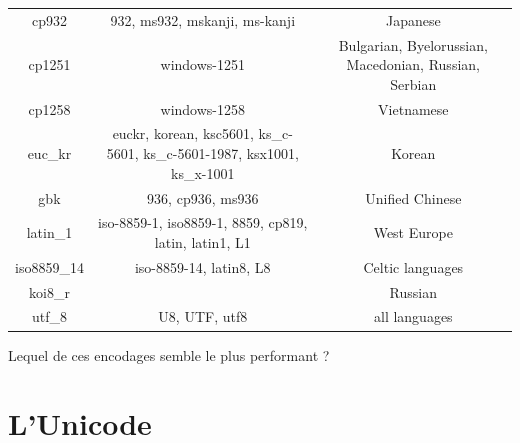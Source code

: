 \begin{center}
{\begin{tabular}{CCC}
            cp932                                                & 932, ms932, mskanji, ms-kanji                                            & Japanese                                              \\
            cp1251                                               & windows-1251                                                             & Bulgarian, Byelorussian, Macedonian, Russian, Serbian \\
            cp1258                                               & windows-1258                                                             & Vietnamese                                            \\
            euc\_kr                                              & euckr, korean, ksc5601, ks\_c-5601, ks\_c-5601-1987, ksx1001, ks\_x-1001 & Korean                                                \\
            gbk                                                  & 936, cp936, ms936                                                        & Unified Chinese                                       \\
            latin\_1                                             & iso-8859-1, iso8859-1, 8859, cp819, latin, latin1, L1                    & West Europe                                           \\
            iso8859\_14                                          & iso-8859-14, latin8, L8                                                  & Celtic languages                                      \\
            koi8\_r                                              &                                                                          & Russian                                               \\
            utf\_8                                               & U8, UTF, utf8                                                            & all languages                                         \\
        \end{tabular}}
\end{center}

\begin{exercice}[]
    Lequel de ces encodages semble le plus performant ?
\end{exercice}


\section{L'Unicode}

